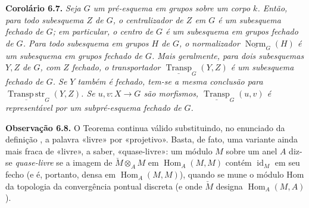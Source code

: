 \medskip
\noindent{}\textbf{Corolário 6.7.}
\textit{Seja \(G\) um pré-esquema em grupos sobre um corpo \(k\).
Então, para todo subesquema \(Z\) de \(G\), o centralizador de \(Z\)
em \(G\) é um subesquema fechado de \(G\); em particular, o centro de
\(G\) é um subesquema em grupos fechado de \(G\).
Para todo subesquema em grupos \(H\) de \(G\), o normalizador
\(\underline{\operatorname{Norm}}_G(H)\) é um subesquema em grupos
fechado de \(G\).
Mais geralmente, para dois subesquemas \(Y,Z\) de \(G\), com \(Z\)
fechado, o transportador \(\underline{\operatorname{Transp}}_G(Y,Z)\)
é um subesquema fechado de \(G\). Se \(Y\) também é fechado,
tem-se a mesma conclusão para
\(\underline{\operatorname{Transp\,str}}_G(Y,Z)\).
Se \(u,v:X\to G\) são morfismos,
\(\underline{\operatorname{Transp}}_G(u,v)\) é representável por um
subpré-esquema fechado de \(G\).}

\medskip
\noindent{}\textbf{Observação 6.8.}
O Teorema  continua válido
substituindo, no enunciado da definição ,
a palavra «livre» por «projetivo». Basta, de fato, uma variante ainda mais
fraca de «livre», a saber, «quase-livre»: um módulo \(M\) sobre um anel
\(A\) diz-se \emph{quase-livre} se a imagem de
\(\check M\otimes_A M\) em \(\operatorname{Hom}_A(M,M)\) contém
\(\operatorname{id}_M\) em seu fecho (e é, portanto, densa em
\(\operatorname{Hom}_A(M,M)\)), quando se mune o módulo Hom da
topologia da convergência pontual discreta (e onde \(\check M\) designa
\(\operatorname{Hom}_A(M,A)\)).

\label{sga3:viii:remark:6:8:eq:star:01}
